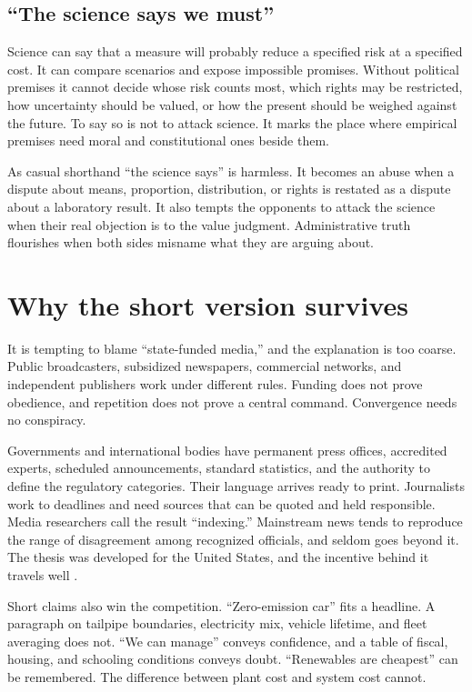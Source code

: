 \documentclass[12pt,a4paper]{book}
\begin{document}
\subsection{``The science says we must''}

Science can say that a measure will probably reduce a specified risk at a specified cost. It can compare scenarios and expose impossible promises. Without political premises it cannot decide whose risk counts most, which rights may be restricted, how uncertainty should be valued, or how the present should be weighed against the future. To say so is not to attack science. It marks the place where empirical premises need moral and constitutional ones beside them.

As casual shorthand ``the science says'' is harmless. It becomes an abuse when a dispute about means, proportion, distribution, or rights is restated as a dispute about a laboratory result. It also tempts the opponents to attack the science when their real objection is to the value judgment. Administrative truth flourishes when both sides misname what they are arguing about.

\section{Why the short version survives}

It is tempting to blame ``state-funded media,'' and the explanation is too coarse. Public broadcasters, subsidized newspapers, commercial networks, and independent publishers work under different rules. Funding does not prove obedience, and repetition does not prove a central command. Convergence needs no conspiracy.

Governments and international bodies have permanent press offices, accredited experts, scheduled announcements, standard statistics, and the authority to define the regulatory categories. Their language arrives ready to print. Journalists work to deadlines and need sources that can be quoted and held responsible. Media researchers call the result ``indexing.'' Mainstream news tends to reproduce the range of disagreement among recognized officials, and seldom goes beyond it. The thesis was developed for the United States, and the incentive behind it travels well \cite{BennettPressState1990}.

Short claims also win the competition. ``Zero-emission car'' fits a headline. A paragraph on tailpipe boundaries, electricity mix, vehicle lifetime, and fleet averaging does not. ``We can manage'' conveys confidence, and a table of fiscal, housing, and schooling conditions conveys doubt. ``Renewables are cheapest'' can be remembered. The difference between plant cost and system cost cannot.
\end{document}
